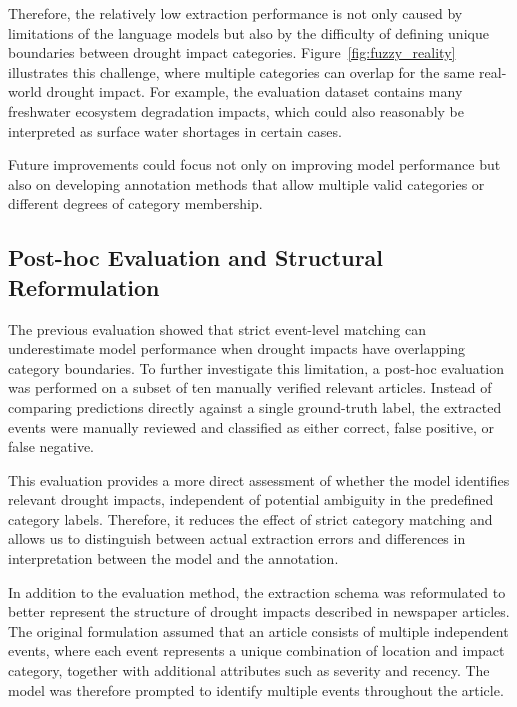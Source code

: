 Therefore, the relatively low extraction performance is not only caused by limitations of the language models but also by the difficulty of defining unique boundaries between drought impact categories. Figure~\ref{fig:fuzzy_reality} illustrates this challenge, where multiple categories can overlap for the same real-world drought impact. For example, the evaluation dataset contains many freshwater ecosystem degradation impacts, which could also reasonably be interpreted as surface water shortages in certain cases.

Future improvements could focus not only on improving model performance but also on developing annotation methods that allow multiple valid categories or different degrees of category membership.









\subsection{Post-hoc Evaluation and Structural Reformulation}

The previous evaluation showed that strict event-level matching can underestimate model performance when drought impacts have overlapping category boundaries. To further investigate this limitation, a post-hoc evaluation was performed on a subset of ten manually verified relevant articles. Instead of comparing predictions directly against a single ground-truth label, the extracted events were manually reviewed and classified as either correct, false positive, or false negative.

This evaluation provides a more direct assessment of whether the model identifies relevant drought impacts, independent of potential ambiguity in the predefined category labels. Therefore, it reduces the effect of strict category matching and allows us to distinguish between actual extraction errors and differences in interpretation between the model and the annotation.

In addition to the evaluation method, the extraction schema was reformulated to better represent the structure of drought impacts described in newspaper articles. The original formulation assumed that an article consists of multiple independent events, where each event represents a unique combination of location and impact category, together with additional attributes such as severity and recency. The model was therefore prompted to identify multiple events throughout the article.

